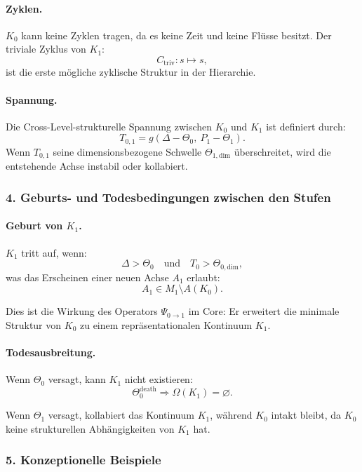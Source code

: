 \paragraph{Zyklen.}
$K_0$ kann keine Zyklen tragen, da es keine Zeit und keine Flüsse besitzt.
Der triviale Zyklus von $K_1$:
\[
C_{\mathrm{triv}} : s \mapsto s,
\]
ist die erste mögliche zyklische Struktur in der Hierarchie.

\paragraph{Spannung.}
Die Cross-Level-strukturelle Spannung zwischen $K_0$ und $K_1$ ist definiert durch:
\[
T_{0,1} = g(\Delta - \Theta_0,\ P_1 - \Theta_1).
\]
Wenn $T_{0,1}$ seine dimensionsbezogene Schwelle $\Theta_{1,\mathrm{dim}}$
überschreitet, wird die entstehende Achse instabil oder kollabiert.

\subsubsection{4. Geburts- und Todesbedingungen zwischen den Stufen}

\paragraph{Geburt von \texorpdfstring{$K_1$}{K_1}.}
$K_1$ tritt auf, wenn:
\[
\Delta > \Theta_0
\quad \text{und} \quad
T_0 > \Theta_{0,\mathrm{dim}},
\]
was das Erscheinen einer neuen Achse $A_1$ erlaubt:
\[
A_1 \in M_1 \setminus A(K_0).
\]

Dies ist die Wirkung des Operators $\Psi_{0\rightarrow 1}$ im Core:
Er erweitert die minimale Struktur von $K_0$ zu einem repräsentationalen
Kontinuum $K_1$.

\paragraph{Todesausbreitung.}
Wenn $\Theta_0$ versagt, kann $K_1$ nicht existieren:
\[
\Theta_0^{\mathrm{death}}
\Rightarrow \Omega(K_1)=\varnothing.
\]

Wenn $\Theta_1$ versagt, kollabiert das Kontinuum $K_1$, während $K_0$ intakt
bleibt, da $K_0$ keine strukturellen Abhängigkeiten von $K_1$ hat.

\subsubsection{5. Konzeptionelle Beispiele}

